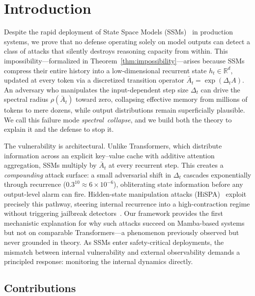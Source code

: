 \documentclass[10pt,twocolumn]{article}
\begin{document}
\section{Introduction}
\label{sec:intro}

Despite the rapid deployment of State Space Models (SSMs)~\cite{gu2023mamba,gu2021efficiently,dao2022hungry} in production systems, we prove that no defense operating solely on model outputs can detect a class of attacks that silently destroys reasoning capacity from within. This impossibility---formalized in Theorem~\ref{thm:impossibility}---arises because SSMs compress their entire history into a low-dimensional recurrent state $h_t \in \mathbb{R}^d$, updated at every token via a discretized transition operator $\bar{A}_t = \exp(\Delta_t A)$. An adversary who manipulates the input-dependent step size $\Delta_t$ can drive the spectral radius $\rho(\bar{A}_t)$ toward zero, collapsing effective memory from millions of tokens to mere dozens, while output distributions remain superficially plausible. We call this failure mode \mbox{\emph{spectral collapse}}, and we build both the theory to explain it and the defense to stop it. %

The vulnerability is architectural. Unlike Transformers, which distribute information across an explicit key--value cache with additive attention aggregation, SSMs multiply by $\bar{A}_t$ at every recurrent step. This creates a \emph{compounding} attack surface: a small adversarial shift in $\Delta_t$ cascades exponentially through recurrence ($0.3^{10} \approx 6 \times 10^{-6}$), obliterating state information before any output-level alarm can fire. Hidden-state manipulation attacks (HiSPA)~\cite{lemercier2026hispa} exploit precisely this pathway, steering internal recurrence into a high-contraction regime without triggering jailbreak detectors~\cite{liu2023jailbreak,zou2023universal}. Our framework provides the first mechanistic explanation for why such attacks succeed on Mamba-based systems but not on comparable Transformers---a phenomenon previously observed but never grounded in theory. As SSMs enter safety-critical deployments, the mismatch between internal vulnerability and external observability demands a principled response: monitoring the internal dynamics directly. %

\subsection{Contributions}
\end{document}
